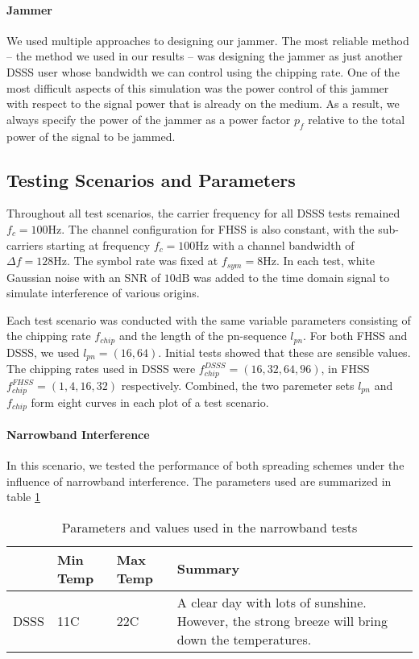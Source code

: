 	\paragraph{Jammer}
	We used multiple approaches to designing our jammer. The most reliable method -- the method we used in our results -- was designing the jammer as just another DSSS user whose bandwidth we can control using the chipping rate. One of the most difficult aspects of this simulation was the power control of this jammer with respect to the signal power that is already on the medium. As a result, we always specify the power of the jammer as a power factor $p_f$ relative to the total power of the signal to be jammed.
	
	\subsection{Testing Scenarios and Parameters}
	Throughout all test scenarios, the carrier frequency for all DSSS tests remained $f_c = 100\text{Hz}$. The channel configuration for FHSS is also constant, with the sub-carriers starting at frequency $f_c = 100\text{Hz}$ with a channel bandwidth of $\Delta f = 128 \text{Hz}$. The symbol rate was fixed at $f_{sym} = 8\text{Hz}$. In each test, white Gaussian noise with an SNR of $10\text{dB}$ was added to the time domain signal to simulate interference of various origins.
	
	Each test scenario was conducted with the same variable parameters consisting of the chipping rate $f_{chip}$ and the length of the pn-sequence $l_{pn}$. For both FHSS and DSSS, we used $l_{pn} = (16, 64)$. Initial tests showed that these are sensible values. The chipping rates used in DSSS were $f_{chip}^{DSSS} = (16,32,64,96)$, in FHSS $f_{chip}^{FHSS} = (1, 4, 16, 32)$ respectively. Combined, the two paremeter sets $l_{pn}$ and $f_{chip}$ form eight curves in each plot of a test scenario.
	
	\paragraph{Narrowband Interference}
	In this scenario, we tested the performance of both spreading schemes under the influence of narrowband interference. The parameters used are summarized in table \ref{tab:narrowband}	
	
	\begin{table}
		\begin{center}
		    \begin{tabular}{ | l | l | l | p{5cm} |}
		    \hline
		    	 & Min Temp & Max Temp & Summary \\ \hline
		    DSSS & 11C & 22C & A clear day with lots of sunshine. However, the strong breeze will bring down the temperatures. \\ 
		    \hline
		    \end{tabular}
		    \caption{Parameters and values used in the narrowband tests}
		   	\label{tab:narrowband}
		\end{center}
	\end{table}	
	
